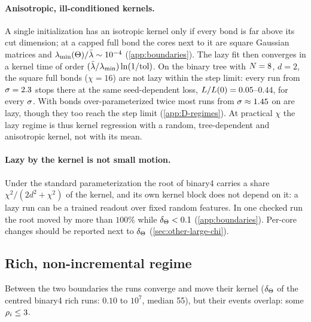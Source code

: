\paragraph{Anisotropic, ill-conditioned kernels.}
\derived{} \empirical{}  A single initialization has an isotropic kernel only if every bond is far
above its cut dimension; at a capped full bond the cores next to it are square Gaussian matrices and
$\lambda_{\min}(\Theta)/\bar\lambda\sim10^{-4}$ (\cref{app:boundaries}). The lazy fit then converges in a kernel time of
order $(\bar\lambda/\lambda_{\min})\ln(1/{\rm tol})$. On the binary tree with $N=8$, $d=2$, the square full bonds
($\chi=16$) are not lazy within the step limit: every run from $\sigma=2.3$ stops there at the same seed-dependent
loss, $L/L(0)=0.05$--$0.44$, for every $\sigma$. With bonds over-parameterized twice most runs from
$\sigma\approx1.45$ on are lazy, though they too reach the step limit (\cref{app:D-regimes}). At practical $\chi$ the
lazy regime is thus kernel regression with a random, tree-dependent and anisotropic kernel, not with its mean.

\paragraph{Lazy by the kernel is not small motion.}
\derived{} Under the standard parameterization the root of binary4 carries a share $\chi^2/(2d^2+\chi^2)$ of the
kernel, and its own kernel block does not depend on it: a lazy run can be a trained readout over fixed random
features. In one checked run the root moved by more than $100\%$ while $\delta_{\Theta}<0.1$ \empirical{}
(\cref{app:boundaries}). Per-core changes should be reported next to $\delta_{\Theta}$ (\cref{sec:other-large-chi}).

\subsection{Rich, non-incremental regime}\label{sec:other-rich}

Between the two boundaries the runs converge and move their kernel ($\delta_{\Theta}$ of the centred binary4 rich runs:
$0.10$ to $10^7$, median 55), but their events overlap: some $\rho_{i}\le3$.


